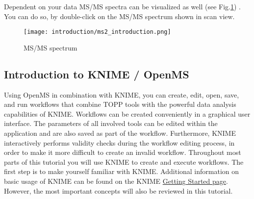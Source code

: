 \noindent Dependent on your data MS/MS spectra can be visualized as well (see Fig.\ref{fig:ms2}) . You can do so, by double-click on the MS/MS spectrum shown in scan view.
\newline
\begin{figure}[!htb]
\texttt{[image: introduction/ms2\_introduction.png]}
\caption{MS/MS spectrum}
\label{fig:ms2}
\end{figure}



\subsection{Introduction to KNIME / OpenMS}
\label{KNIME_Intro}

Using OpenMS in combination with KNIME, you can create, edit, open, save, and run workflows
that combine TOPP tools with the powerful data analysis capabilities of KNIME. Workflows can
be created conveniently in a graphical user interface. The parameters of all involved
tools can be edited within the application and are also saved as part of the workflow.
Furthermore, KNIME interactively performs validity checks during the workflow editing
process, in order to make it more difficult to create an invalid workflow.
\newline
\noindent Throughout most parts of this tutorial you will use KNIME to create and
execute workflows. The first step is to make yourself familiar with KNIME. Additional
information on basic usage of KNIME can be found on the KNIME
\href{https://tech.knime.org/knime}{Getting Started page}. However,
the most important concepts will also be reviewed in this tutorial.

